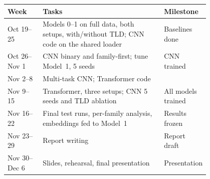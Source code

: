 \documentclass[11pt]{article}
\begin{document}
\smallskip
{\footnotesize
\begin{tabular}{@{}lp{0.6\linewidth}p{0.2\linewidth}@{}}
  \toprule
  Week & Tasks & Milestone \\
  \midrule
  Oct 19--25 & Models 0--1 on full data, both setups, with/without TLD; CNN code on the shared loader & Baselines done \\
  Oct 26--Nov 1 & CNN binary and family-first; tune Model~1, 5 seeds & CNN trained \\
  Nov 2--8 & Multi-task CNN; Transformer code & \\
  Nov 9--15 & Transformer, three setups; CNN 5 seeds and TLD ablation & All models trained \\
  Nov 16--22 & Final test runs, per-family analysis, embeddings fed to Model~1 & Results frozen \\
  Nov 23--29 & Report writing & Report draft \\
  Nov 30--Dec 6 & Slides, rehearsal, final presentation & Presentation \\
  \bottomrule
\end{tabular}}



\end{document}
